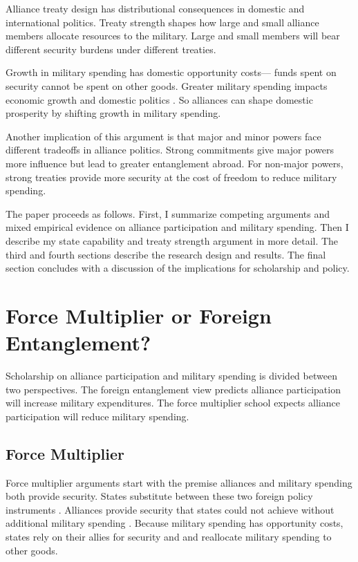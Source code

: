 \documentclass[12pt]{article}
\begin{document}
Alliance treaty design has distributional consequences in domestic and international politics.
Treaty strength shapes how large and small alliance members allocate resources to the military. 
Large and small members will bear different security burdens under different treaties.


Growth in military spending has domestic opportunity costs--- funds spent on security cannot be spent on other goods. 
Greater military spending impacts economic growth \citep{ShinWard1999, AlptekinLevine2012} and domestic politics \citep{Narizny2003, WhittenWilliams2011, Williams2015}.
So alliances can shape domestic prosperity by shifting growth in military spending. 


Another implication of this argument is that major and minor powers face different tradeoffs in alliance politics.
Strong commitments give major powers more influence but lead to greater entanglement abroad.
For non-major powers, strong treaties provide more security at the cost of freedom to reduce military spending. 


The paper proceeds as follows. 
First, I summarize competing arguments and mixed empirical evidence on alliance participation and military spending. 
Then I describe my state capability and treaty strength argument in more detail. 
The third and fourth sections describe the research design and results. 
The final section concludes with a discussion of the implications for scholarship and policy.  


\section{Force Multiplier or Foreign Entanglement?}


Scholarship on alliance participation and military spending is divided between two perspectives. 
The foreign entanglement view predicts alliance participation will increase military expenditures.
The force multiplier school expects alliance participation will reduce military spending. 


\subsection{Force Multiplier} 


Force multiplier arguments start with the premise alliances and military spending both provide security.
States substitute between these two foreign policy instruments \citep{MostStarr1989}.  
Alliances provide security that states could not achieve without additional military spending \citep{Morrow1993, Conybeare1994}. 
Because military spending has opportunity costs, states rely on their allies for security and and reallocate military spending to other goods. 
\end{document}
